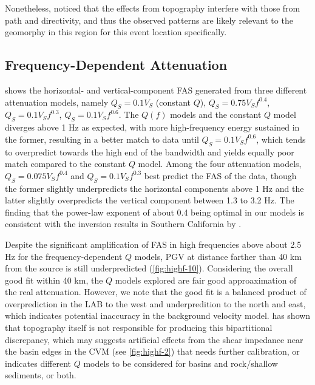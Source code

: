 Nonetheless, \citet{leeEffectsRealisticSurface2009} noticed that the effects from topography interfere with those from path and directivity, and thus the observed patterns are likely relevant to the geomorphy in this region for this event location specifically.


\subsection{Frequency-Dependent Attenuation}\label{highf:qf}
 shows the horizontal- and vertical-component FAS generated from three different attenuation models, namely $Q_S=0.1V_S$ (constant $Q$), $Q_S=0.75V_Sf^{0.4}$, $Q_S=0.1V_Sf^{0.3}$, $Q_S=0.1V_Sf^{0.6}$. The $Q(f)$ models and the constant $Q$ model diverges above 1 Hz as expected, with more high-frequency energy sustained in the former, resulting in a better match to data until $Q_S=0.1V_Sf^{0.6}$, which tends to overpredict towards the high end of the bandwidth and yields equally poor match compared to the constant $Q$ model. Among the four attenuation models, $Q_S=0.075V_Sf^{0.4}$ and $Q_S=0.1V_Sf^{0.3}$ best predict the FAS of the data, though the former slightly underpredicts the horizontal components above 1 Hz and the latter slightly overpredicts the vertical component between 1.3 to 3.2 Hz. The finding that the power-law exponent of about 0.4 being optimal in our models is consistent with the inversion results in Southern California by \citet{linFrequencyDependentAttenuationWaves2018}.


Despite the significant amplification of FAS in high frequencies above about 2.5 Hz for the frequency-dependent $Q$ models, PGV at distance farther than 40 km from the source is still underpredicted (\cref{fig:highf-10}). Considering the overall good fit within 40 km, the $Q$ models explored are fair good approaximation of the real attenuation. However, we note that the good fit is a balanced product of overprediction in the LAB to the west and underpredition to the north and east, which indicates potential inaccuracy in the background velocity model.  has shown that topography itself is not responsible for producing this bipartitional discrepancy, which may suggests artificial effects from the shear impedance near the basin edges in the CVM (see \cref{fig:highf-2}) that needs further calibration, or indicates different $Q$ models to be considered for basins and rock/shallow sediments, or both.


